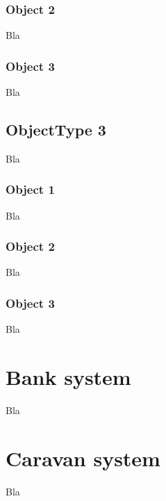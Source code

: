 \documentclass[a4paper,12pt]{book}
\begin{document}
\subsubsection{Object 2}
Bla
\subsubsection{Object 3}
Bla
\subsection{ObjectType 3}
Bla
\subsubsection{Object 1}
Bla
\subsubsection{Object 2}
Bla
\subsubsection{Object 3}
Bla
\section{Bank system}
Bla
\section{Caravan system}
Bla
\end{document}
